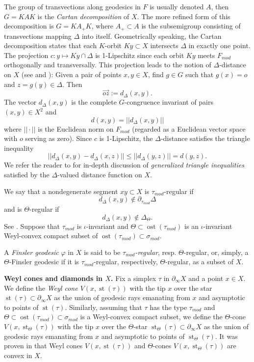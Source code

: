 \documentclass[12pt]{article}
\theoremstyle{boldplain}
\theoremstyle{bolddefinition}
\numberwithin{equation}{section}
\def\De{\Delta}
\def\si{\sigma}
\def\Dt{\partial_{\tau_{mod}}}
\def\Fmod{F_{mod}}
\def\geo{\partial_{\infty}}
\def\simod{\si_{mod}}
\def\st{\operatorname{st}}
\def\ost{\operatorname{ost}}
\def\taumod{\tau_{mod}}
\def\ov{\overrightarrow}
\begin{document}
 The group of transvections along geodesics in $F$ is usually denoted $A$, then $G=KAK$ is the {\em Cartan decomposition} of $X$. The more refined form of this decomposition is $G=KA_+K$, where $A_+\subset A$ is the subsemigroup consisting of transvections mapping $\Delta$ into itself. 
 Geometrically speaking, the Cartan decomposition states that each $K$-orbit $Ky\subset X$ intersects  $\Delta$ in exactly one point. The projection $c: y\mapsto Ky\cap \Delta$ is 1-Lipschitz 
 since  each orbit $Ky$ meets $\Fmod$ orthogonally and transversally. This projection leads to the 
 notion of $\Delta$-distance on $X$ (see \cite[\S 2.6]{anolec} and \cite{KLM}): Given a pair of points $x, y\in X$, find $g\in G$ such that 
 $g(x)=o$ and $z=g(y)\in \Delta$. Then
 $$
 \ov{oz}:= d_\Delta(x,y). 
 $$  
 The vector $d_\Delta(x,y)$ is the complete $G$-congruence invariant of pairs $(x,y)\in X^2$ and 
 $$
 d(x,y)= ||d_\Delta(x,y)||
 $$ 
 where $||\cdot||$ is the Euclidean norm on $\Fmod$ (regarded as a Euclidean vector space with $o$ serving as zero).   Since $c$ is 1-Lipschitz, the $\Delta$-distance satisfies the triangle inequality
 $$
 ||d_\Delta(x,y) - d_\Delta(x,z)||\le ||d_\Delta(y,z)||= d(y,z). 
 $$
We refer the reader to \cite{KLM} for in-depth discussion of {\em generalized triangle inequalities} 
satisfied by the $\Delta$-valued distance function on $X$. 

We say that a nondegenerate segment $xy\subset X$ is $\taumod$-regular if 
$$
d_\Delta(x,y)\notin  \Dt\De
$$
 and is $\Theta$-regular if 
 $$
d_\Delta(x,y)\notin  \De_\Theta. 
$$
See \cite[\S 2.5.3]{anolec}. Suppose that $\taumod$ is $\iota$-invariant and $\Theta\subset \ost(\taumod)$ is an $\iota$-invariant Weyl-convex compact subset of $\ost(\taumod)\subset \simod$.  

A {\em Finsler geodesic} $\varphi$ in $X$ is said to be 
{\em $\taumod$-regular}, resp. $\Theta$-regular, or, simply, a $\Theta$-Finsler geodesic if it is $\taumod$-regular, respectively, $\Theta$-regular, as a subset of $X$.   

 \medskip
 {\bf Weyl cones and diamonds in $X$.} Fix a simplex $\tau$ in $\geo X$ and a point $x\in X$. 
 We define the {\em Weyl cone $V(x, \st(\tau))$} with the tip $x$ over the star $\st(\tau)\subset \geo X$ as the union of geodesic rays emanating from $x$ and asymptotic to points of $\st(\tau)$. Similarly, assuming that $\tau$ has the type 
  $\taumod$  and $\Theta\subset \ost(\taumod)\subset \simod$ is a Weyl-convex compact subset, we define the $\Theta$-cone  $V(x, \st_\Theta(\tau))$ with the tip $x$ over the $\Theta$-star 
 $\st_\Theta(\tau)\subset \geo X$ as the union of geodesic rays emanating from $x$ and asymptotic to points of $\st_\Theta(\tau)$. It was proven in  \cite[\S 2.5]{anolec} that Weyl cones  
 $V(x, \st(\tau))$ and $\Theta$-cones $V(x, \st_\Theta(\tau))$ are convex in $X$. 
 
\end{document}

